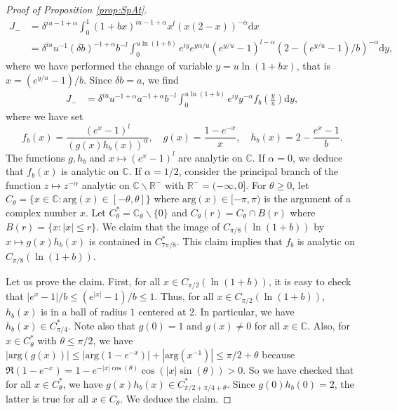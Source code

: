 \documentclass[]{scrartcl}
\newcommand{\R}{\mathds{R}}
\newcommand{\C}{\mathds{C}}
\renewcommand{\d}{\mathrm{d}}
\numberwithin{equation}{section}
\numberwithin{figure}{section}
\begin{document}
\begin{proof}[Proof of Proposition \ref{prop:SpAt}]
	\begin{align*}
		J_- &=  \delta^{iu - 1 + \alpha} \int_{0}^{1} ( 1+ b x )^{iu - 1 + \alpha} x^l ( x(2- x))^{ -\alpha } \d x  \\
		& = \delta^{iu} u^{-1} (\delta b)^{-1 + \alpha } b ^{-l} \int_{0}^{u \ln (1 + b)} e^{iy } e^{y \alpha / u }  (e^{y/u} -1)^{l - \alpha}  (2-(e^{y/u} -1)/b )^{- \alpha } \d y,
	\end{align*}
	where we have performed the change of variable $y = u \ln ( 1 + bx)$, that is $x = (e^{y/u} -1)/b$. Since $\delta b = a$, we find
	\begin{align*}
		J_- 
		& = \delta^{iu} u^{-1+\alpha} a^{-1 + \alpha } b ^{-l} \int_{0}^{u \ln (1 + b)} e^{iy} y^{-\alpha} f_b\left(\frac y u \right) \d y,
	\end{align*}
	where we have set 
	$$
	f_b(x) =  \frac{(e^{x} -1)^{l} }{ \left( g(x)  h_b(x) \right)^{\alpha} }, \quad g(x) =  \frac{1-e^{-x} }{x} , \quad h_b(x) =  2 - \frac{e^{x} -1}{b}.
	$$		
	The functions $g,h_b$ and $x \mapsto (e^x-1)^l$ are analytic on $\C$. If $\alpha = 0$, we deduce that $f_b(x)$ is analytic on $\C$. If $\alpha = 1/2$, consider the principal branch of the function $z \mapsto z^{-\alpha}$ analytic on $\C \backslash \R^-$ with $\R^- = (-\infty,0]$.  For $\theta \geq 0$, let $C_\theta = \{ x \in \C : \mathrm{arg} (x) \in [-\theta,\theta] \}$ where $\mathrm{arg}(x) \in [-\pi,\pi)$ is the argument of a complex number $x$. Let $C^*_\theta = \C_\theta \backslash \{0\}$ and $C_\theta (r) = C_\theta \cap B(r)$ where $B(r) = \{ x : |x| \leq r\}$. We claim that the image of $C_{\pi/8}  (\ln (1+b))$ by $x \mapsto g(x)  h_b(x)$ is contained in $C^*_{7\pi / 8}$. This claim implies that  $f_b$ is analytic on $C_{\pi/8}  (\ln (1+b))$.

Let us prove the claim. First, for all $x \in C_{\pi/2} ( \ln(1+b))$, it is easy to check that  $|e^x - 1|/b \leq (e^{|x|} - 1 ) / b \leq 1$. Thus, for all $x \in C_{\pi/2} ( \ln(1+b))$, $h_b(x)$ is in a ball of radius $1$ centered at $2$. In particular, we have $h_b(x) \in C^*_{\pi/4}$. Note also that $g(0) = 1$ and $g(x) \ne 0$ for all $x \in \C$. Also, for $ x \in C^*_\theta$ with $\theta \leq \pi/2$, we have $|\mathrm{arg} (g(x))| \leq |\mathrm{arg} (1 - e^{-x})| + |\mathrm{arg} (x^{-1})| \leq \pi / 2 + \theta$ because $\Re(1 - e^{-x}) = 1 -e^{-|x| \cos (\theta)} \cos (|x| \sin (\theta))  >0$. So we have checked that for all $x \in C^*_\theta$, we have $g(x)  h_b(x) \in C^*_{\pi/2 + \pi/4 + \theta}$. Since $g(0)  h_b(0) = 2$, the latter is true for all $x \in C_\theta$. We deduce the claim. 



\end{proof}
\end{document}
